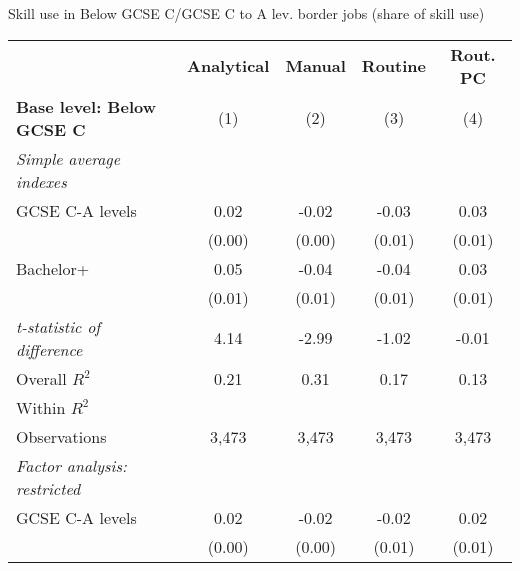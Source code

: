 \begin{center}
\begin{threeparttable}[!h]
\caption{Skill use in Below GCSE C/GCSE C to A lev. border jobs (share of skill use)}
\label{tab:skillRegs}
\begin{tabular}{lcccc}
\toprule
\toprule
&\multicolumn{1}{c}{\textbf{Analytical}}&\multicolumn{1}{c}{\textbf{Manual}}&\multicolumn{1}{c}{\textbf{Routine}}&\multicolumn{1}{c}{\textbf{Rout. PC}} \\
\textbf{Base level: Below GCSE C}&\multicolumn{1}{c}{(1)}&\multicolumn{1}{c}{(2)}&\multicolumn{1}{c}{(3)}&\multicolumn{1}{c}{(4)} \\
\midrule
\textit{Simple average indexes}\vspace{1mm} \\ 
\hspace{3mm}GCSE C-A levels&        0.02\sym{***}&       -0.02\sym{***}&       -0.03\sym{***}&        0.03\sym{***}\\
                    &      (0.00)         &      (0.00)         &      (0.01)         &      (0.01)         \\
\hspace{3mm}Bachelor+&        0.05\sym{***}&       -0.04\sym{***}&       -0.04\sym{***}&        0.03\sym{***}\\
                    &      (0.01)         &      (0.01)         &      (0.01)         &      (0.01)         \\
\textit{t-statistic of difference}&        4.14         &       -2.99         &       -1.02         &       -0.01         \\
\midrule Overall $ R^2$&        0.21         &        0.31         &        0.17         &        0.13         \\
Within $ R^2$       &                     &                     &                     &                     \\
Observations        &       3,473         &       3,473         &       3,473         &       3,473         \\
\midrule \vspace{1mm}\textit{Factor analysis: restricted} \\ 
\hspace{3mm}GCSE C-A levels&        0.02\sym{***}&       -0.02\sym{***}&       -0.02\sym{***}&        0.02\sym{***}\\
                    &      (0.00)         &      (0.00)         &      (0.01)         &      (0.01)         \\

\end{tabular}
\end{threeparttable}
\end{center}

